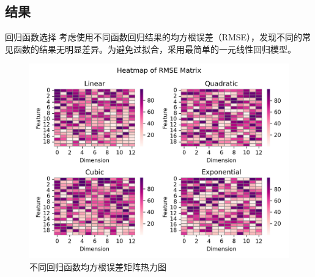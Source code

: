 \documentclass[10pt]{beamer}
\begin{document}
\subsection{结果}
\begin{frame}{回归函数选择}
    考虑使用不同函数回归结果的均方根误差（RMSE），发现不同的常见函数的结果无明显差异。为避免过拟合，采用最简单的一元线性回归模型。
    \begin{figure}[h]
        \caption{\label{fig:regression}不同回归函数均方根误差矩阵热力图}
        \centering
        \includegraphics[scale=0.4]{RMatrix.png}
    \end{figure}
\end{frame}
\end{document}
